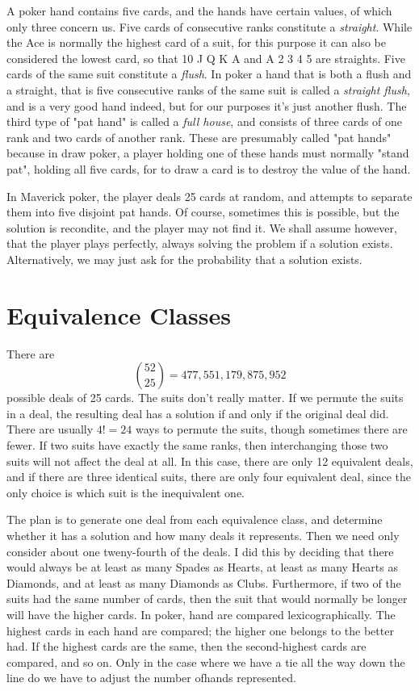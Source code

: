 \documentclass [12pt, letterpaper] {article}
\begin{document}
A poker hand contains five cards, and the hands have certain values, of which only three concern us.
Five cards of consecutive ranks constitute a \textit{straight}.  While the Ace is normally the highest 
card of a suit, for this purpose it can also be considered the lowest card, so that 10 J Q K A and A 2 3 4 5
are straights.  Five cards of the same suit  constitute a \textit{flush}.  In poker a hand that is both a
flush and a straight, that is five consecutive ranks of the same suit is called a \textit{straight flush}, 
and is a very good hand indeed, but for our purposes it's just another flush.  The third type
of "pat hand" is called a \textit{full house}, and consists of three cards of one rank and two cards of another rank.
These are presumably called "pat hands" because in draw poker, a player holding one of these
hands must normally "stand pat", holding all five cards, for to draw a card is to destroy the 
value of the hand.

In Maverick poker, the player deals 25 cards at random, and attempts to separate them into five disjoint pat hands.
Of course, sometimes this is possible, but the solution is recondite, and the player may not find it.
We shall assume however, that the player plays perfectly, always solving the problem if a solution exists.  
Alternatively, we may just ask for the probability that a solution exists.

\section{Equivalence Classes}
There are \[\binom{52}{25}=477,551,179,875,952\] possible deals of 25 cards.  The suits don't really matter.  
If we permute the suits in a deal, the resulting deal has a solution if and only if the original deal did.  There are usually $4! =24$ ways to 
permute the suits, though sometimes there are fewer.  If two suits have exactly the same ranks, then interchanging those
two suits will not affect the deal at all.  In this case, there are only 12 equivalent deals, and if there are three identical suits, 
there are only four equivalent deal, since the only choice is which suit is the inequivalent one.

The plan is to generate one deal from each equivalence class, and determine whether it has a solution and how many deals it represents.
Then we need only consider about one tweny-fourth of the deals.  I did this by deciding that there would always be at least
as many Spades as Hearts, at least as many Hearts as Diamonds, and at least as many Diamonds as Clubs.  Furthermore,
if two of the suits had the same number of cards, then the suit that would normally be longer
will have the higher cards.  In poker, hand are compared lexicographically.  The highest cards in each hand are compared; the higher one belongs to the 
better had.  If the highest cards are the same, then the second-highest cards are compared, and so on.  Only
in the case where we have a tie all the way down the line do we have to adjust the number ofhands represented.
\end{document}
